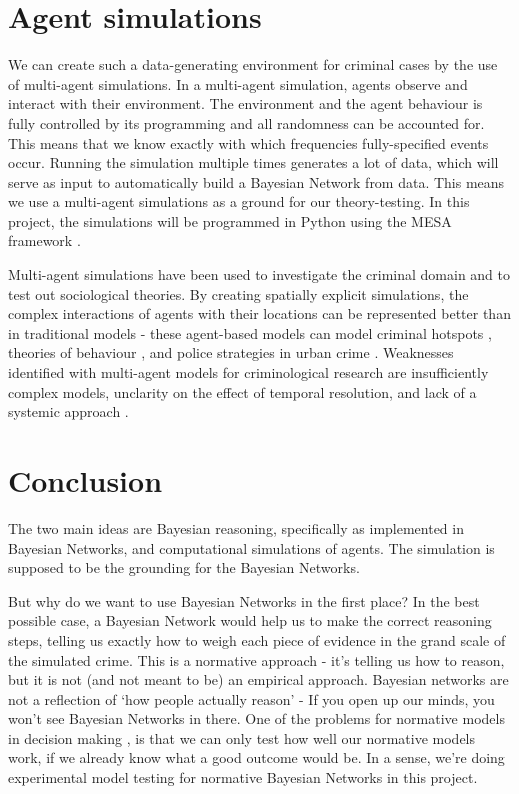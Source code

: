 \section{Agent simulations}
We can create such a data-generating environment for criminal cases by the use of multi-agent simulations. In a multi-agent simulation, agents observe and interact with their environment. The environment and the agent behaviour is fully controlled by its programming and all randomness can be accounted for. This means that we know exactly with which frequencies fully-specified events occur. Running the simulation multiple times generates a lot of data, which will serve as input to automatically build a Bayesian Network from data. This means we use a multi-agent simulations as a ground for our theory-testing. In this project, the simulations will be programmed in Python using the MESA framework  \citep{mesa2020}.


Multi-agent simulations have been used to investigate the criminal domain and to test out sociological theories. By creating spatially explicit simulations, the complex interactions of agents with their locations can be represented better than in traditional models - these agent-based models can model criminal hotspots \citep{Gerritsen2008}, theories of behaviour \citep{Gerritsen2015}, and police strategies in urban crime \citep{Zhu2021}. Weaknesses identified with multi-agent models for criminological research are insufficiently complex models, unclarity on the effect of temporal resolution, and lack of a systemic approach \citep{Zhu2021}.





 \section{Conclusion}

The two main ideas are Bayesian reasoning, specifically as implemented in Bayesian Networks, and computational simulations of agents. The simulation is supposed to be the grounding for the Bayesian Networks.

But why do we want to use Bayesian Networks in the first place? In the best possible case, a Bayesian Network would help us to make the correct reasoning steps, telling us exactly how to weigh each piece of evidence in the grand scale of the simulated crime. This is a normative approach - it's telling us how to reason, but it is not (and not meant to be) an empirical approach. Bayesian networks are not a reflection of `how people actually reason' - If you open up our minds, you won't see Bayesian Networks in there. One of the problems for normative models in decision making \citep{colyvan2013}, is that we can only test how well our normative models work, if we already know what a good outcome would be. In a sense, we're doing experimental model testing for normative Bayesian Networks in this project.


